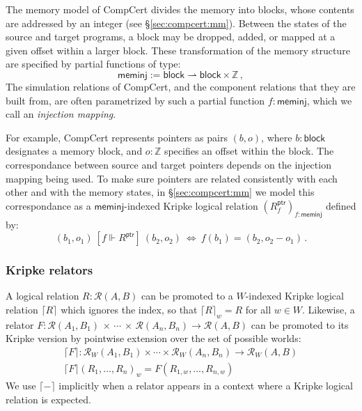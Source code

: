 \documentclass[acmsmall,timestamp,review,anonymous]{acmart}
\newcommand{\kw}[1]{\ensuremath{ \mathsf{#1} }}
\newcommand{\ifr}[1]{\ [{#1}]\ }
\begin{document}
\begin{example} \label{ex:meminj} %
The memory model of CompCert divides the memory into blocks,
whose contents are addressed by an integer
(see \S\ref{sec:compcert:mm}).
Between the states of the source and target programs,
a block may be dropped, added, or
mapped at a given offset within a larger block.
These transformation of the memory structure
are specified by partial functions of type:
\[
  \kw{meminj} := \kw{block} \rightharpoonup \kw{block} \times \mathbb{Z} \,,
\]
The simulation relations of CompCert,
and the component relations that they are built from,
are often parametrized by such a partial function $f : \kw{meminj}$,
which we call an \emph{injection mapping}.

For example,
CompCert represents pointers as pairs $(b, o)$, where
$b : \kw{block}$ designates a memory block, and
$o : \mathbb{Z}$ specifies an offset within the block.
The correspondance between source and target pointers
depends on the injection mapping being used.
To make sure pointers are related consistently
with each other and with the memory states,
in \S\ref{sec:compcert:mm}
we model this correspondance as a $\kw{meminj}$-indexed
Kripke logical relation $(R^\kw{ptr}_f)_{f : \kw{meminj}}$
defined by:
\[
    (b_1, o_1) \ifr{f \Vdash R^\kw{ptr}} (b_2, o_2) \:\Leftrightarrow\:
    f(b_1) = (b_2, o_2 - o_1) \,.
\]
\end{example}

\subsubsection{Kripke relators}

A logical relation $R : \mathcal{R}(A, B)$
can be promoted to a $W$-indexed Kripke logical relation $\lceil R \rceil$
which ignores the index, so that $\lceil R \rceil_w = R$ for all $w \in W$.
Likewise,
a relator
  $F : \mathcal{R}(A_1, B_1) \,\times\,\cdots\,\times\,\mathcal{R}(A_n, B_n) \rightarrow \mathcal{R}(A, B)$
can be promoted to its Kripke version
by pointwise extension over the set of possible worlds:
\begin{gather*}
  \lceil F \rceil : \mathcal{R}_W(A_1, B_1) \times \cdots \times \mathcal{R}_W(A_n, B_n) \rightarrow \mathcal{R}_W(A, B) \\
  \lceil F \rceil (R_1, \ldots, R_n)_w = F(R_{1,w}, \ldots, R_{n,w})
\end{gather*}
We use $\lceil - \rceil$ implicitly
when a relator appears in a context where
a Kripke logical relation is expected.
\end{document}
